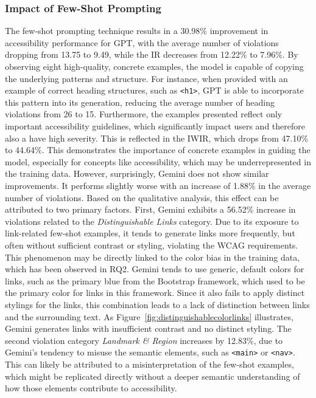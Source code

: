 \subsubsection{Impact of Few-Shot Prompting}
The few-shot prompting technique results in a 30.98\% improvement
in accessibility performance for GPT, with the average number 
of violations dropping from 13.75 to 9.49, while the IR 
decreases from 12.22\% to 7.96\%. By observing eight 
high-quality, concrete examples, the model is capable of 
copying the underlying patterns and structure. For instance,
when provided with an example of correct heading structures, such 
as \texttt{<h1>}, GPT is able to incorporate this pattern into its
generation, reducing the average number of heading violations 
from 26 to 15. Furthermore, the examples presented 
reflect only important accessibility guidelines, which 
significantly impact users and therefore also a have high 
severity. This is reflected in the IWIR, which drops from 
47.10\% to 44.64\%.
This demonstrates the importance of concrete 
examples in guiding the model, especially for concepts like
accessibility, which may be underrepresented in the training data.\newline
However, surprisingly, Gemini does not show similar improvements.
It performs slightly worse with an increase of 1.88\% in the average
number of violations. Based on the qualitative analysis, this
effect can be attributed to two primary factors. First, Gemini
exhibits a 56.52\% increase in violations related to the
\emph{Distinguishable Links} category. Due to its exposure
to link-related few-shot examples, it tends to generate links more 
frequently, but often without sufficient contrast or 
styling, violating the WCAG requirements. This phenomenon 
may be directly linked to the color bias in the training data,
which has been observed in RQ2. Gemini tends to use generic, default 
colors for links, such as the primary blue from the Bootstrap framework,
which used to be the primary color for links in this framework. 
Since it also fails to apply distinct stylings for the links, this
combination leads to 
a lack of distinction between links and the surrounding text.
As Figure~\ref{fig:distinguishablecolorlinks} illustrates, 
Gemini generates links with insufficient contrast and no distinct styling.
\newline
The second violation category 
\emph{Landmark \& Region} increases by 12.83\%, due to 
Gemini's tendency to misuse the semantic 
elements, such as \texttt{<main>} or \texttt{<nav>}. This 
can likely be attributed to a misinterpretation of 
the few-shot examples, which might be replicated 
directly without a deeper semantic understanding of 
how those elements contribute to accessibility.

